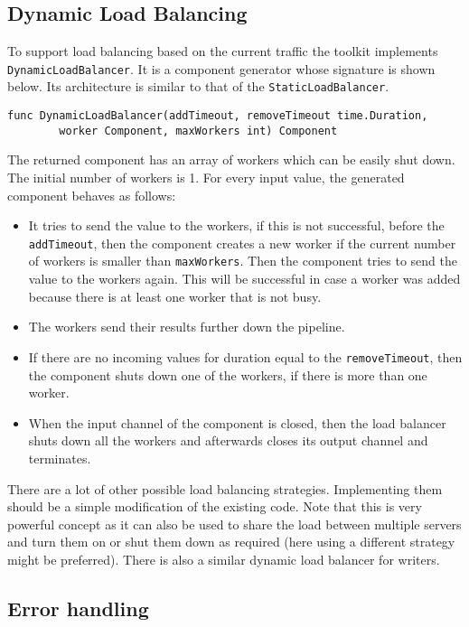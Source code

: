 \subsection{Dynamic Load Balancing}
To support load balancing based on the current traffic the toolkit implements
\texttt{DynamicLoadBalancer}. It is a component generator whose signature is
shown below. Its architecture is similar
to that of the \texttt{StaticLoadBalancer}.
\begin{lstlisting}
func DynamicLoadBalancer(addTimeout, removeTimeout time.Duration, 
        worker Component, maxWorkers int) Component
\end{lstlisting}
The returned component has an array of workers which can be easily shut down.
The initial number of workers is 1. 
For every input value, the generated component behaves as follows:
\begin{itemize}
	\item It tries to send the value to the workers, if this is not successful, 
		    before the \texttt{addTimeout}, then the component creates a new worker
        if the current number of workers is smaller than \texttt{maxWorkers}.
        Then the component tries to send the value to the workers again. This will 
        be successful in case a worker was added because there is at least one 
        worker that is not busy.

	\item The workers send their results further down the pipeline.

	\item If there are no incoming values for duration equal to the 
        \texttt{removeTimeout}, then the component shuts down one 
        of the workers, if there is more than one worker.

	\item When the input channel of the component is closed, then the load balancer 
        shuts down all the workers and afterwards closes its output channel and
        terminates.
\end{itemize}
There are a lot of other possible load balancing strategies. 
Implementing them should be a simple modification of the existing code.
Note that this is very powerful concept as it can also be used to share
the load between multiple servers and turn them on or shut them down as
required (here using a different strategy might be preferred). There is
also a similar dynamic load balancer for writers.

\subsection{Error handling}

